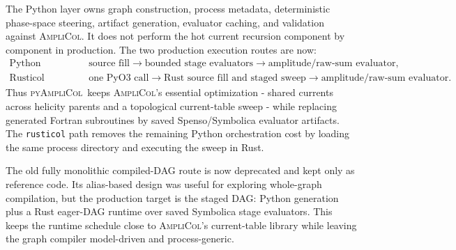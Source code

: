 \documentclass[10pt]{article}
\newcommand{\AC}{\textsc{AmpliCol}}
\newcommand{\PAC}{\textsc{pyAmpliCol}}
\begin{document}
The Python layer owns graph construction, process metadata, deterministic
phase-space steering, artifact generation, evaluator caching, and validation
against \AC.  It does not perform the hot current recursion component by
component in production.  The two production execution routes are now:
\begin{align*}
  \text{Python staged route:}&\quad
  \text{source fill} \to \text{bounded stage evaluators} \to
  \text{amplitude/raw-sum evaluator},\\
  \text{Rusticol route:}&\quad
  \text{one PyO3 call} \to \text{Rust source fill and staged sweep} \to
  \text{amplitude/raw-sum evaluator}.
\end{align*}
Thus \PAC\ keeps \AC's essential optimization - shared currents across helicity
parents and a topological current-table sweep - while replacing generated
Fortran subroutines by saved Spenso/Symbolica evaluator artifacts.  The
\texttt{rusticol} path removes the remaining Python orchestration cost by
loading the same process directory and executing the sweep in Rust.

The old fully monolithic compiled-DAG route is now deprecated and kept only as
reference code.  Its alias-based design was useful for exploring whole-graph
compilation, but the production target is the staged DAG: Python generation plus
a Rust eager-DAG runtime over saved Symbolica stage evaluators.  This keeps the
runtime schedule close to \AC's current-table library while leaving the graph
compiler model-driven and process-generic.
\end{document}
